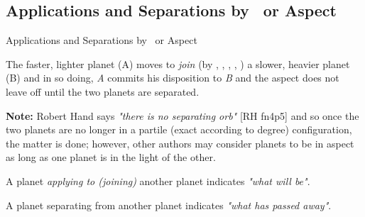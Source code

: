 \subsection{Applications and Separations by \Conjunction\ or Aspect}

\begin{frame}[t]{Applications and Separations by \Conjunction\ or Aspect}
\begin{block}{}
The faster, lighter planet (A) moves to \textsl{join} (by \Conjunction, \Sextile, \Square, \Trine, \Opposition) a slower, heavier planet (B) and in so doing, \textsl{A} commits his disposition to \textsl{B} and the aspect does not leave off until the two planets are separated.
\end{block}

\begin{mdframed}[backgroundcolor=gray!5, rightmargin=2em, leftmargin=2em]
\textbf{Note:} Robert Hand says \textsl{"there is no separating orb"} [RH fn4p5] and so once the two planets are no longer in a partile (exact according to degree) configuration, the matter is done; however, other authors may consider planets to be in aspect as long as one planet is in the light of the other.\footnotemark[1]
\end{mdframed}

\begin{block}{}
A planet \textsl{applying to (joining)} another planet indicates \textsl{"what will be"}. 
\end{block}

\begin{block}{}
A planet separating from another planet indicates \textsl{"what has passed away"}.
\end{block}


\end{frame}